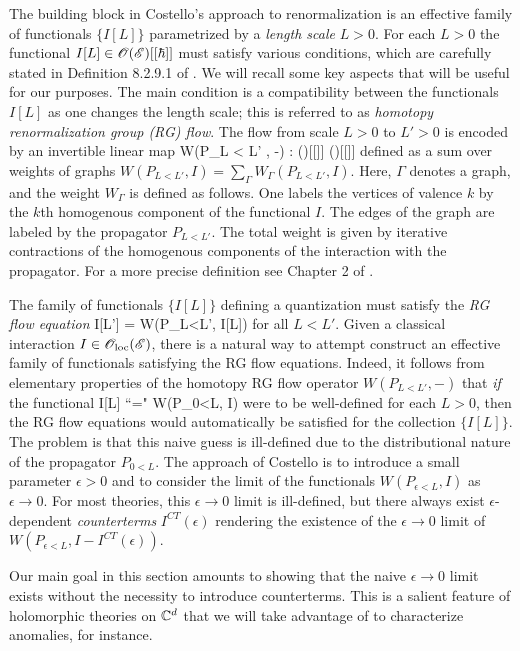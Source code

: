 \documentclass[10pt]{amsart}
\begin{document}
The building block in Costello's approach to renormalization is an effective family of functionals $\{I[L]\}$ parametrized by a {\em length scale} $L > 0$. 
For each $L > 0$ the functional $I[L] \in \mathscr O(\mathscr E)[[\hbar]]$ must satisfy various conditions, which are carefully stated in Definition 8.2.9.1 of \cite{CG2}. 
We will recall some key aspects that will be useful for our purposes. 
The main condition is a compatibility between the functionals $I[L]$ as one changes the length scale; this is referred to as {\em homotopy renormalization group (RG) flow}.
The flow from scale $L>0$ to $L'>0$ is encoded by an invertible linear map
\ben
W(P_{L < L'} , -) : \sO(\sE)[[\hbar]] \to \sO(\sE)[[\hbar]]
\een
defined as a sum over weights of graphs $W (P_{L<L'}, I) = \sum_{\Gamma} W_{\Gamma}(P_{L<L'}, I)$. 
Here, $\Gamma$ denotes a graph, and the weight $W_\Gamma$ is defined as follows.
One labels the vertices of valence $k$ by the $k$th homogenous component of the functional $I$. 
The edges of the graph are labeled by the propagator $P_{L<L'}$.
The total weight is given by iterative contractions of the homogenous components of the interaction with the propagator. 
For a more precise definition see Chapter 2 of \cite{CosRenorm}.

The family of functionals $\{I[L]\}$ defining a quantization must satisfy the {\em RG flow equation}
\ben
I[L'] = W(P_{L<L'}, I[L])
\een
for all $L < L'$. 
Given a classical interaction $I \in {\mathscr O}_{\rm loc}(\mathscr E)$, there is a natural way to attempt construct an effective family of functionals satisfying the RG flow equations.
Indeed, it follows from elementary properties of the homotopy RG flow operator $W(P_{L < L'}, -)$ that {\em if} the functional
\ben
I[L] \;\; ``=" \;\; W(P_{0<L}, I) 
\een
were to be well-defined for each $L >0$, then the RG flow equations would automatically be satisfied for the collection $\{I[L]\}$. 
The problem is that this naive guess is ill-defined due to the distributional nature of the propagator $P_{0<L}$. 
The approach of Costello is to introduce a small parameter $\epsilon > 0$ and to consider the limit of the functionals $W(P_{\epsilon < L}, I)$ as $\epsilon \to 0$. 
For most theories, this $\epsilon \to 0$ limit is ill-defined, but there always exist $\epsilon$-dependent {\em counterterms} $I^{CT}(\epsilon)$ rendering the existence of the $\epsilon \to 0$ limit of $W(P_{\epsilon < L}, I - I^{CT}(\epsilon))$. 

Our main goal in this section amounts to showing that the naive $\epsilon \to 0$ limit exists without the necessity to introduce counterterms. 
This is a salient feature of holomorphic theories on $\mathbb C^d$ that we will take advantage of to characterize anomalies, for instance. 
\end{document}
